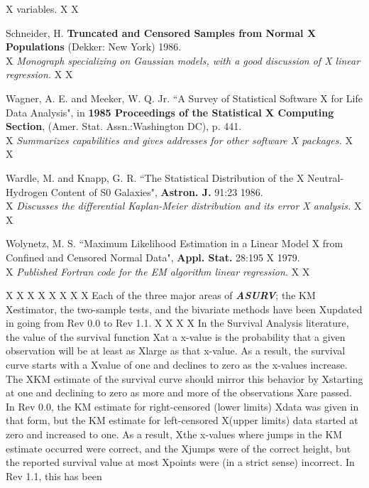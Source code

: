 \begin{description}
{X    variables.}
X
X\item [] Schneider, H. {\bf Truncated and Censored Samples from Normal 
X    Populations} (Dekker: New York) 1986.\\
X    {\it Monograph specializing on Gaussian models, with a good discussion of 
X    linear regression.}
X
X\item [] Wagner, A. E. and Meeker, W. Q. Jr. ``A Survey of Statistical Software
X    for Life Data Analysis", in {\bf 1985 Proceedings of the Statistical 
X    Computing Section}, (Amer. Stat. Assn.:Washington DC), p. 441.\\
X    {\it Summarizes capabilities and gives addresses for other software
X     packages.}
X
X\item [] Wardle, M. and Knapp, G. R. ``The Statistical Distribution of the 
X    Neutral-Hydrogen Content of S0 Galaxies", {\bf Astron. J.} 91:23 1986.\\
X    {\it Discusses the differential Kaplan-Meier distribution and its error
X    analysis.}
X
X\item [] Wolynetz, M. S. ``Maximum Likelihood Estimation in a Linear Model 
X    from     Confined and Censored Normal Data", {\bf Appl. Stat.} 28:195 
X    1979.\\
X    {\it Published Fortran code for the EM algorithm linear regression.}
X
X\end{description}
X
X\bigskip
X\bigskip
X
X
X
X
X     Each of the three major areas of {\sl\bf ASURV}; the KM 
Xestimator, the two-sample tests, and the bivariate methods have been 
Xupdated in going from Rev 0.0 to Rev 1.1. 
X
X
X
X     In the Survival Analysis literature, the value of the survival function
Xat a x-value is the probability that a given observation will be at least as
Xlarge as that x-value.  As a result, the survival curve starts with a 
Xvalue of one and declines to zero as the x-values increase.  The 
XKM estimate of the survival curve should mirror this behavior by 
Xstarting at one and declining to zero as more and more of the observations
Xare passed.  In Rev 0.0, the KM estimate for right-censored (lower limits) 
Xdata was given in that form, but the KM estimate for left-censored
X(upper limits) data started at zero and increased to one.  As a result,
Xthe x-values where jumps in the KM estimate occurred were correct, and the 
Xjumps were of the correct height, but the reported survival value at most 
Xpoints were (in a strict sense) incorrect.  In Rev 1.1, this has been
